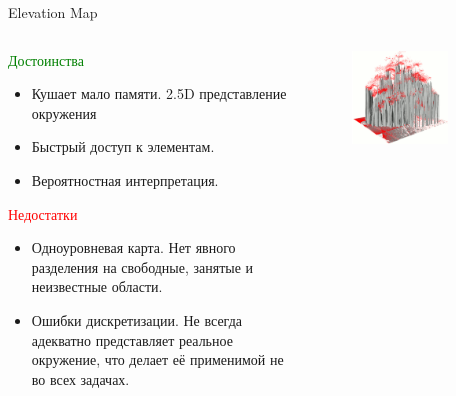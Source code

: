 \documentclass[9pt]{beamer}
\begin{document}
\begin{frame}{Elevation Map}
\begin{columns}
\begin{column}{0.60\textwidth}
  \begin{block}{\textcolor{green}{Достоинства}}
    \begin{itemize}
    \item
    { 
      Кушает мало памяти. 2.5D представление окружения
    }
    \item
    {
      Быстрый доступ к элементам.
    }
    \item
    {
      Вероятностная интерпретация.
    }
    \end{itemize}
  \end{block}

  \begin{block}{\textcolor{red}{Недостатки}}
    \begin{itemize}
    \item
    { 
      Одноуровневая карта. Нет явного разделения на свободные, занятые и неизвестные области.
    }
    \item
    {
      Ошибки дискретизации. Не всегда адекватно представляет реальное окружение, что делает её применимой не во всех задачах.
    }
    \end{itemize}
  \end{block}
\end{column}
\begin{column}{0.40\textwidth}
\begin{figure}[h]
    \centering
    \includegraphics[width=0.8\textwidth]{elev_tree.png}
\end{figure}
\end{column}
\end{columns}
\end{frame}
\end{document}
